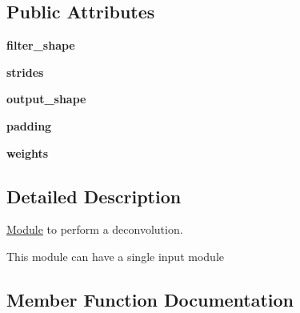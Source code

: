 \subsection*{Public Attributes}
\begin{DoxyCompactItemize}
\item 
\mbox{\label{classmodules_1_1_conv2_d_transpose_module_adc3ca12449e5a7ef8456f0e2332075a6}} 
{\bfseries filter\+\_\+shape}
\item 
\mbox{\label{classmodules_1_1_conv2_d_transpose_module_a885a832074360edfb622eb40b4cbc8ee}} 
{\bfseries strides}
\item 
\mbox{\label{classmodules_1_1_conv2_d_transpose_module_a8dfce8281b7bd58a9797b84c1f3f94cc}} 
{\bfseries output\+\_\+shape}
\item 
\mbox{\label{classmodules_1_1_conv2_d_transpose_module_ab207775ad3259edda6cb6fc01b5e67f0}} 
{\bfseries padding}
\item 
\mbox{\label{classmodules_1_1_conv2_d_transpose_module_a160963233d3a6e83ab47917a28b7bcac}} 
{\bfseries weights}
\end{DoxyCompactItemize}


\subsection{Detailed Description}
\hyperlink{classmodules_1_1_module}{Module} to perform a deconvolution. 

This module can have a single input module 

\subsection{Member Function Documentation}
\mbox{\label{classmodules_1_1_conv2_d_transpose_module_a39b975d02ff419a91c3e5e9addd5aa18}} 
